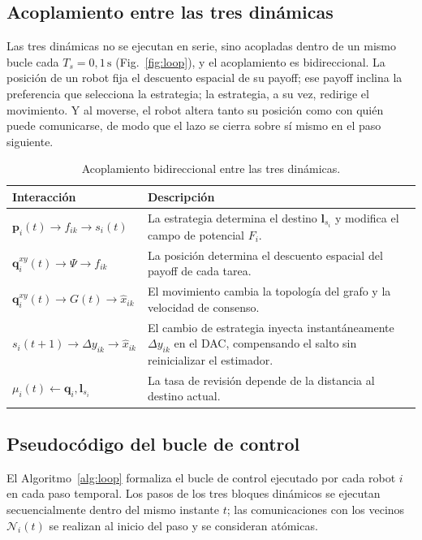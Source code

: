 \subsection{Acoplamiento entre las tres dinámicas}
\label{subsec:acoplamiento}

Las tres dinámicas no se ejecutan en serie, sino acopladas dentro de un mismo bucle
cada $T_s = 0{,}1\,\text{s}$ (Fig.~\ref{fig:loop}), y el acoplamiento es bidireccional.
La posición de un robot fija el descuento espacial de su payoff; ese payoff inclina la
preferencia que selecciona la estrategia; la estrategia, a su vez, redirige el
movimiento. Y al moverse, el robot altera tanto su posición como con quién puede
comunicarse, de modo que el lazo se cierra sobre sí mismo en el paso siguiente.



\begin{table}[htbp]
\centering
\caption[Acoplamiento entre dinámicas]{Acoplamiento bidireccional entre las tres dinámicas.}
\label{tab:acoplamiento}
\begin{tabularx}{\textwidth}{>{\bfseries}p{}Y}
\toprule
Interacción & Descripción \\
\midrule
$\mathbf{p}_i(t) \to f_{ik} \to s_i(t)$ &
  La estrategia determina el destino $\mathbf{l}_{s_i}$ y modifica el campo de
  potencial $F_i$. \\
$\mathbf{q}_i^{xy}(t) \to \Psi \to f_{ik}$ &
  La posición determina el descuento espacial del payoff de cada tarea. \\
$\mathbf{q}_i^{xy}(t) \to G(t) \to \hat{x}_{ik}$ &
  El movimiento cambia la topología del grafo y la velocidad de consenso. \\
$s_i(t{+}1) \to \Delta y_{ik} \to \hat{x}_{ik}$ &
  El cambio de estrategia inyecta instantáneamente $\Delta y_{ik}$ en el DAC,
  compensando el salto sin reinicializar el estimador. \\
$\mu_i(t) \gets \mathbf{q}_i, \mathbf{l}_{s_i}$ &
  La tasa de revisión depende de la distancia al destino actual. \\
\bottomrule
\end{tabularx}
\end{table}

\subsection{Pseudocódigo del bucle de control}
\label{subsec:pseudocodigo}

El Algoritmo~\ref{alg:loop} formaliza el bucle de control ejecutado por cada robot
$i$ en cada paso temporal. Los pasos de los tres bloques dinámicos se ejecutan
secuencialmente dentro del mismo instante $t$; las comunicaciones con los vecinos
$\mathcal{N}_i(t)$ se realizan al inicio del paso y se consideran atómicas.

